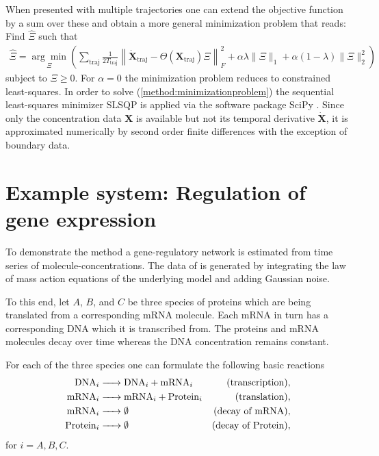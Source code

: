 \documentclass[oneside, abstracton, titlepage]{scrartcl}
\begin{document}
	When presented with multiple trajectories one can extend the objective function by a sum over these and obtain a more general minimization problem that reads: Find $\hat{\Xi}$ such that
	\begin{align}
		\hat{\Xi} = \underset{\Xi}{\arg\min}\left( \sum_{\text{traj}}\frac{1}{2T_{\text{traj}}}\left\| \dot{\textbf{X}}_\text{traj} - \Theta(\textbf{X}_\text{traj})\Xi \right\|_F^2 + \alpha\lambda\|\Xi\|_1 + \alpha(1-\lambda)\|\Xi\|_2^2 \right)
	\end{align}
	subject to $\Xi\geq 0$.
	For $\alpha=0$ the minimization problem reduces to constrained least-squares. In order to solve (\ref{method:minimizationproblem}) the sequential least-squares minimizer SLSQP \cite{Kraft1988} is applied via the software package SciPy \cite{SciPy}. Since only the concentration data $\mathbf{X}$ is available but not its temporal derivative $\dot{\mathbf{X}}$, it is approximated numerically by second order finite differences with the exception of boundary data.

    \section{Example system: Regulation of gene expression}\label{sec:generegulation}

    To demonstrate the method a gene-regulatory network is estimated from time series of molecule-concentrations. The data of is generated by integrating the law of mass action equations of the underlying model and adding Gaussian noise.
    
    To this end, let $A$, $B$, and $C$ be three species of proteins which are being translated from a corresponding mRNA molecule. Each mRNA in turn has a corresponding DNA which it is transcribed from. The proteins and mRNA molecules decay over time whereas the DNA concentration remains constant.
    
    For each of the three species one can formulate the following basic reactions
	\begin{align*}
        \ce{ DNA_i } & \ce{ -> DNA_i + mRNA_i } &\text{(transcription)}, \\
        \ce{ mRNA_i } & \ce{ -> mRNA_i + Protein_i } &\text{(translation)}, \\
        \ce{ mRNA_i } & \ce{ -> } \emptyset &\text{(decay of mRNA)}, \\
        \ce{ Protein_i } & \ce{ -> } \emptyset &\text{(decay of Protein)},
    \end{align*}
    for $i=A,B,C$.
\end{document}
